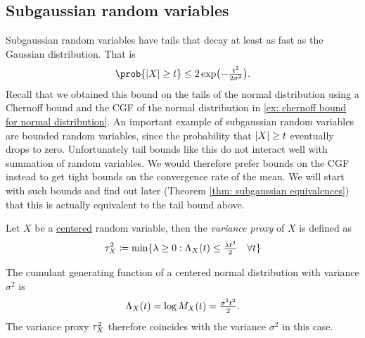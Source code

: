 \subsection{Subgaussian random variables}

Subgaussian random variables have tails that decay at least as fast as the
Gaussian distribution. That is
\[
    \prob{\abs{X} \ge t} \le 2 \exp\bigl(-\tfrac{t^2}{2\sigma^2}\bigr).
\]
Recall that we obtained this bound on the tails of the normal distribution using
a Chernoff bound and the CGF of the normal distribution in \eqref{ex: chernoff
bound for normal distribution}.
An important example of subgaussian random variables
are bounded random variables, since the probability 
that \(\lvert X\rvert \ge t\) eventually drops to zero.
Unfortunately tail bounds like this do not interact
well with summation of random variables. We would therefore prefer bounds on the
CGF instead to get tight bounds on the convergence rate of the mean. We will
start with such bounds and find out later (Theorem \ref{thm: subgaussian
equivalences}) that this is actually equivalent to the tail bound above.

\begin{definition}
    Let \(X\) be a \underline{centered} random variable, then
    the \emph{variance proxy} of \(X\) is defined as
    \[
        \tau^2_{X} \coloneq \min\{\lambda \ge 0 : \Lambda_X(t) \le \tfrac{\lambda t^2}2 \quad \forall t\}
    \]
\end{definition}

The cumulant generating function of a centered normal distribution with variance
\(\sigma^2\) is
\[
    \Lambda_X(t) = \log M_X(t) = \tfrac{\sigma^2t^2}{2}.
\]
The variance proxy \(\tau^2_{X}\) therefore coincides with the variance \(\sigma^2\) in
this case.


